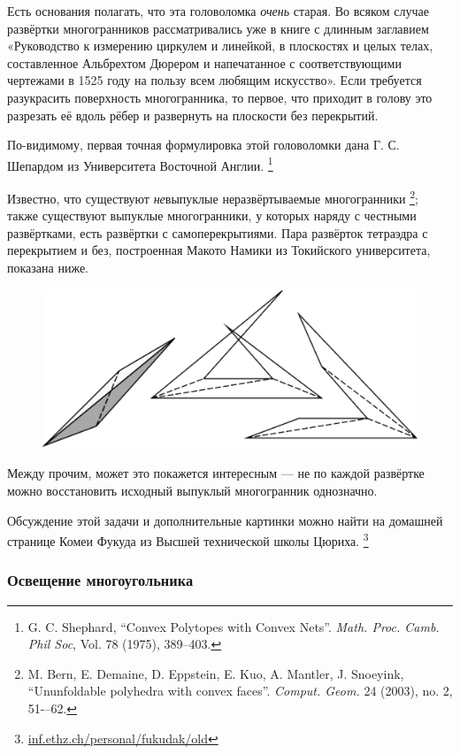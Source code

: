 Есть основания полагать, что эта головоломка \emph{очень} старая. 
Во всяком случае развёртки многогранников рассматривались уже в книге с длинным заглавием «Руководство к измерению циркулем и линейкой, в плоскостях и целых телах, составленное Альбрехтом Дюрером и напечатанное с соответствующими чертежами в 1525 году на пользу всем любящим искусство».
Если требуется разукрасить поверхность многогранника, то первое, что приходит в голову это разрезать её вдоль рёбер и развернуть на плоскости без перекрытий.

По-видимому, первая точная формулировка этой головоломки дана Г. С. Шепардом из Университета Восточной Англии.%
\footnote{G. C. Shephard, ``Convex Polytopes with Convex Nets''. \emph{Math. Proc. Camb. Phil Soc}, Vol. 78 (1975), 389--403.}
 
Известно, что существуют \emph{не}выпуклые неразвёртываемые многогранники%
\footnote{M. Bern, E. Demaine, D. Eppstein, E. Kuo, A. Mantler, J. Snoeyink, 
``Ununfoldable polyhedra with convex faces''.
\emph{Comput. Geom.} 24 (2003), no. 2, 51-–62.};
также существуют выпуклые многогранники, у которых наряду с честными развёртками, есть развёртки с самоперекрытиями. 
Пара развёрток тетраэдра с перекрытием и без, построенная Макото Намики из Токийского университета, показана ниже.

\begin{figure}[h!]
\centering
\includegraphics[scale=0.5]{Figs/UnsolvedPuzzles/unfold}
\end{figure}

Между прочим, может это покажется интересным --- не по каждой развёртке можно восстановить исходный выпуклый многогранник однозначно. %

Обсуждение этой задачи и дополнительные картинки можно найти на домашней странице Комеи Фукуда из Высшей технической школы Цюриха.%
\footnote{\href{https://inf.ethz.ch/personal/fukudak/old/}{\url{inf.ethz.ch/personal/fukudak/old}}}

\subsubsection*{Освещение многоугольника}

